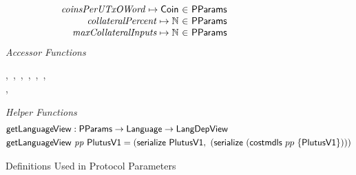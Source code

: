 \begin{figure*}[htb]
\begin{equation*}
\begin{array}{r@{~\in~}l@{\qquad}r}
        \var{coinsPerUTxOWord} \mapsto \Coin & \PParams \\
        \var{collateralPercent} \mapsto \N & \PParams \\
        \var{maxCollateralInputs} \mapsto \N & \PParams \\
      \end{array}
  \end{equation*}
  \emph{Accessor Functions}
  \begin{center}
    ,~,~,~,~,~,\\
    ,~
  \end{center}
  \emph{Helper Functions}
  \begin{align*}
    & \mathsf{getLanguageView} : \mathsf{PParams} \to \mathsf{Language} \to \mathsf{LangDepView} \\
    & \mathsf{getLanguageView}~\mathit{pp}~\mathsf{PlutusV1} = (\mathsf{serialize}~\mathsf{PlutusV1}, ~ (\mathsf{serialize}~(\mathsf{costmdls}~{pp}~\{\mathsf{PlutusV1}\})))
  \end{align*}
  \caption{Definitions Used in Protocol Parameters}
  \label{fig:defs:protocol-parameters}
\end{figure*}
